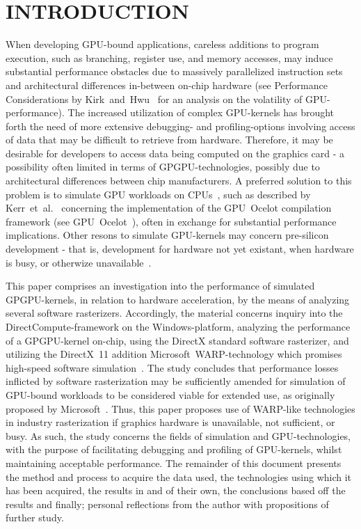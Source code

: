 
\section{INTRODUCTION}
\label{sec:introduction}
When developing GPU-bound applications, careless additions to  program execution, such as branching, register use, and memory accesses, may induce substantial performance obstacles due to massively parallelized instruction sets and architectural differences in-between on-chip hardware (see Performance Considerations by Kirk~and~Hwu~\cite[ch.~6]{Kirk:2010:PMP:1841511} for an analysis on the volatility of GPU-performance).
The increased utilization of complex GPU-kernels has brought forth the need of more extensive debugging- and profiling-options involving access of data that may be difficult to retrieve from hardware.
Therefore, it may be desirable for developers to access data being computed on the graphics card - a possibility often limited in terms of GPGPU-technologies, possibly due to architectural differences between chip manufacturers.
A preferred solution to this problem is to simulate GPU workloads on CPUs~, such as described by Kerr~et~al.~\cite[p.~416-419]{Hwu:2011:GCG:2103614} concerning the implementation of the GPU~Ocelot compilation framework (see GPU~Ocelot~), often in exchange for substantial performance implications.
Other resons to simulate GPU-kernels may concern pre-silicon development - that is, development for hardware not yet existant, when hardware is busy, or otherwize unavailable~.

This paper comprises an investigation into the performance of simulated GPGPU-kernels, in relation to hardware acceleration, by the means of analyzing several software rasterizers.
Accordingly, the material concerns inquiry into the DirectCompute-framework on the Windows-platform, analyzing the performance of a GPGPU-kernel on-chip, using the DirectX standard software rasterizer, and utilizing the DirectX~11 addition Microsoft~WARP-technology which promises high-speed software simulation~.
The study concludes that performance losses inflicted by software rasterization may be sufficiently amended for simulation of GPU-bound workloads to be considered viable for extended use, as originally proposed by Microsoft~.
Thus, this paper proposes use of WARP-like technologies in industry rasterization if graphics hardware is unavailable, not sufficient, or busy.
As such, the study concerns the fields of simulation and GPU-technologies, with the purpose of facilitating debugging and profiling of GPU-kernels, whilst maintaining acceptable performance.
The remainder of this document presents the method and process to acquire the data used, the technologies using which it has been acquired, the results in and of their own, the conclusions based off the results and finally; personal reflections from the author with propositions of further study.
